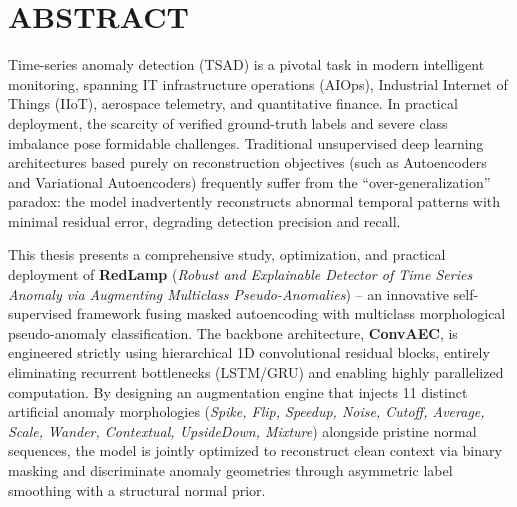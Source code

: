 \documentclass[11pt,journal,onecolumn]{IEEEtran}
\begin{document}
\newpage

\section*{ABSTRACT}

Time-series anomaly detection (TSAD) is a pivotal task in modern intelligent monitoring, spanning IT infrastructure operations (AIOps), Industrial Internet of Things (IIoT), aerospace telemetry, and quantitative finance. In practical deployment, the scarcity of verified ground-truth labels and severe class imbalance pose formidable challenges. Traditional unsupervised deep learning architectures based purely on reconstruction objectives (such as Autoencoders and Variational Autoencoders) frequently suffer from the ``over-generalization'' paradox: the model inadvertently reconstructs abnormal temporal patterns with minimal residual error, degrading detection precision and recall.

This thesis presents a comprehensive study, optimization, and practical deployment of \textbf{RedLamp} (\textit{Robust and Explainable Detector of Time Series Anomaly via Augmenting Multiclass Pseudo-Anomalies}) -- an innovative self-supervised framework fusing masked autoencoding with multiclass morphological pseudo-anomaly classification. The backbone architecture, \textbf{ConvAEC}, is engineered strictly using hierarchical 1D convolutional residual blocks, entirely eliminating recurrent bottlenecks (LSTM/GRU) and enabling highly parallelized computation. By designing an augmentation engine that injects 11 distinct artificial anomaly morphologies (\textit{Spike, Flip, Speedup, Noise, Cutoff, Average, Scale, Wander, Contextual, UpsideDown, Mixture}) alongside pristine normal sequences, the model is jointly optimized to reconstruct clean context via binary masking and discriminate anomaly geometries through asymmetric label smoothing with a structural normal prior.
\end{document}
